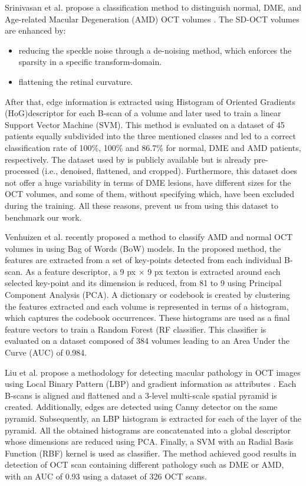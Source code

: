 Srinivasan et al. propose a classification method to distinguish normal, DME, and Age-related Macular Degeneration (AMD) OCT volumes \cite{srinivasan2014fully}.
The SD-OCT volumes are enhanced by: 
\begin{itemize}
\item reducing the speckle noise through a de-noising method, which enforces the sparsity in a specific transform-domain.
\item flattening the retinal curvature.
\end{itemize}  
After that, edge information is extracted using Histogram of Oriented Gradients (HoG)descriptor for each B-scan of a volume and later used to train a linear Support Vector Machine (SVM).
This method is evaluated on a dataset of 45 patients equally subdivided into the three mentioned classes and led to a correct classification rate of 100\%, 100\% and 86.7\% for normal, DME and AMD
patients, respectively.
The dataset used by \cite{srinivasan2014fully} is publicly available but is already pre-processed (i.e., denoised, flattened, and cropped).
Furthermore, this dataset does not offer a huge variability in terms of DME lesions, have different sizes for the OCT volumes, and some of them, without specifying which, have been excluded during the training.
All these reasons, prevent us from using this dataset to benchmark our work.

Venhuizen et al. recently proposed a method to classify AMD and normal OCT volumes in \cite{venhuizen2015automated} using Bag of Words (BoW) models.
In the proposed method, the features are extracted from a set of key-points detected from each individual B-scan.
As a feature descriptor, a 9 px × 9 px texton is extracted around each selected key-point and its dimension is reduced, from 81 to 9 using Principal Component Analysis (PCA).
A dictionary or codebook is created by clustering the features extracted and each volume is represented in terms of a histogram, which captures the codebook occurrences.
These histograms are used as a final feature vectors to train a Random Forest (RF classifier.
This classifier is evaluated on a dataset composed of 384 volumes leading to an Area Under the Curve (AUC) of 0.984.

Liu et al. propose a methodology for detecting macular pathology in OCT images using Local Binary Pattern (LBP) and gradient information as attributes \cite{liu2011automated}.
Each B-scans is aligned and flattened and a 3-level multi-scale spatial pyramid is created. Additionally, edges are detected using Canny detector on the same pyramid.
Subsequently, an LBP histogram is extracted for each of the layer of the pyramid.
All the obtained histograms are concatenated into a global descriptor whose dimensions are reduced using PCA.
Finally, a SVM with an Radial Basis Function (RBF) kernel is used as classifier.
The method achieved good results in detection of OCT scan containing different pathology such as DME or AMD, with an AUC of 0.93 using a dataset of 326 OCT scans.

